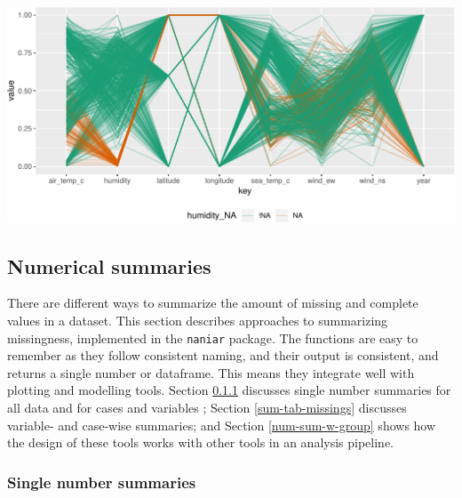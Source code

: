 \documentclass[]{article}
\let\origfigure\figure
\let\endorigfigure\endfigure
\renewenvironment{figure}[1][2] {
    \expandafter\origfigure\expandafter[H]
} {
    \endorigfigure
}
\theoremstyle{definition}
\theoremstyle{definition}
\theoremstyle{definition}
\theoremstyle{remark}
\begin{document}
\begin{figure}

{\centering \includegraphics[width=1\linewidth]{tidy-missing-data-paper_files/figure-latex/parallel-cord-plot-1} 

}

\caption{Parallel coordinate plot shows missing values imputed 10\% below range for the oceanbuoys dataset. Values are colored by missingness of humidity. Humidity is missing for low air and sea temperatures, and is missing for one year and one location. }\label{fig:parallel-cord-plot}
\end{figure}

\hypertarget{num-sum}{%
\subsection{Numerical summaries}\label{num-sum}}

There are different ways to summarize the amount of missing and complete
values in a dataset. This section describes approaches to summarizing
missingness, implemented in the \texttt{naniar} package. The functions
are easy to remember as they follow consistent naming, and their output
is consistent, and returns a single number or dataframe. This means they
integrate well with plotting and modelling tools. Section
\ref{single-num-sum} discusses single number summaries for all data and
for cases and variables ; Section \ref{sum-tab-missings} discusses
variable- and case-wise summaries; and Section \ref{num-sum-w-group}
shows how the design of these tools works with other tools in an
analysis pipeline.

\hypertarget{single-num-sum}{%
\subsubsection{Single number summaries}\label{single-num-sum}}
\end{document}

